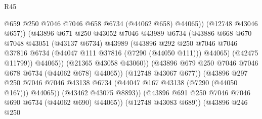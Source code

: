 \begin{lexlean}{R45}
\begin{coremodule}
{                                            @659
                                            @250
                                            @7046
                                            @7046
                                            @658
                                            @6734
                                            (@44062 @658)
                                            @44065))
                                        (@12748 @43046 @657))
                                      (@43896
                                        @671
                                        @250
                                        @43052
                                        @7046
                                        @43989
                                        @6734
                                        (@43886
                                          @668
                                          @670
                                          @7048
                                          @43051
                                          (@43137 @6734)
                                          @43989
                                          (@43896
                                            @292
                                            @250
                                            @7046
                                            @7046
                                            @37816
                                            @6734
                                            (@44047 @111 @37816 (@7290 (@44050 @111)))
                                            @44065)
                                          (@42475 @11799))
                                        @44065))
                                    (@21365 @43058 @43060))
                                  (@43896 @679 @250 @7046 @7046 @678 @6734 (@44062 @678) @44065))
                                (@12748 @43067 @677))
                              (@43896
                                @297
                                @250
                                @7046
                                @7046
                                @43138
                                @6734
                                (@44047 @167 @43138 (@7290 (@44050 @167)))
                                @44065))
                            (@43462 @43075 @8893))
                          (@43896 @691 @250 @7046 @7046 @690 @6734 (@44062 @690) @44065))
                        (@12748 @43083 @689))
                      (@43896
                        @246
                        @250
}
\end{coremodule}
\end{lexlean}
